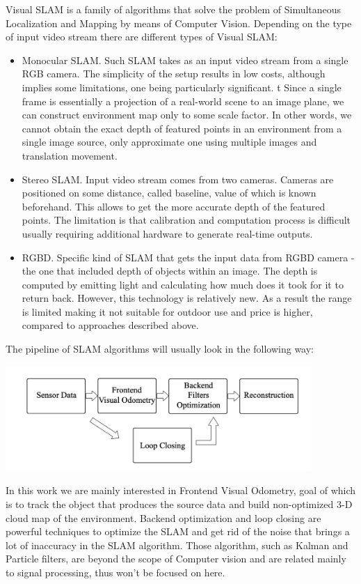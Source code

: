 Visual SLAM is a family of algorithms that solve the problem of Simultaneous Localization and Mapping by means of Computer Vision. Depending on the type of input video stream there are different types of Visual SLAM:
\begin{itemize}
    \item Monocular SLAM. Such SLAM takes as an input video stream from a single RGB camera. The simplicity of the setup results in low costs, although implies some limitations, one being particularly significant. t Since a single frame is essentially a projection of a real-world scene to an image plane, we can construct environment map only to some scale factor. In other words, we cannot obtain the exact depth of featured points in an environment from a single image source, only approximate one using multiple images and translation movement.
    \item Stereo SLAM. Input video stream comes from two cameras. Cameras are positioned on some distance, called baseline, value of which is known beforehand. This allows to get the more accurate depth of the featured points. The limitation is that calibration and computation process is difficult usually requiring additional hardware to generate real-time outputs.
    \item RGBD. Specific kind of SLAM that gets the input data from RGBD camera - the one that included depth of objects within an image. The depth is computed by emitting light and calculating how much does it took for it to return back. However, this technology is relatively new. As a result the range is limited making it not suitable for outdoor use and price is higher, compared to approaches described above.
\end{itemize}


The pipeline of SLAM algorithms will usually look in the following way:
\begin{center}
    \includegraphics[height=4cm]{pipeline.png}\\[1cm]
\end{center}

In this work we are mainly interested in Frontend Visual Odometry, goal of which is to track the object that produces the source data and build non-optimized 3-D cloud map of the environment. Backend optimization and loop closing are powerful techniques to optimize the SLAM and get rid of the noise that brings a lot of inaccuracy in the SLAM algorithm. Those algorithm, such as Kalman and Particle filters, are beyond the scope of Computer vision and are related mainly to signal processing, thus won't be focused on here.

